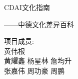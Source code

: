\documentclass[12pt, notitlepage]{ctexbook}
\begin{document}
	\pagestyle{empty}
	
	\cleardoublepage
	\thispagestyle{empty}
	\begin{titlepage}
	\centering
	\vspace*{6cm}
	\noindent
	\center
	\begin{minipage}{0.7\linewidth}
	\heiti CDAI文化指南\par
	\vspace{12pt}
	\songti ——中德文化差异百科\par
	\vspace{8cm}
	\heiti{}
	\raggedright
	项目成员:\\
	
	\vspace*{1em}
	黄伟根\\
	黄耀鑫 \hspace{1em} 杨星林 \hspace{1em} 詹均升 \\
	张嘉伟 \hspace{1em} 周功豪 \hspace{1em} 周鹏 \\
	\end{minipage}
	\end{titlepage}

	\cleardoublepage
	

	\tableofcontents

	\pagestyle{headings}	
	
	
	
\end{document}
